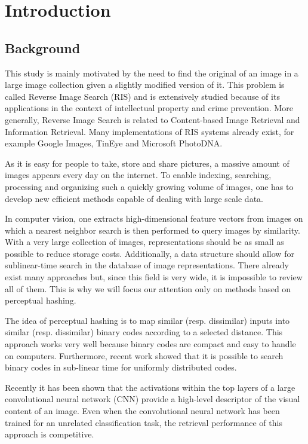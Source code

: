 \chapter{Introduction}

\section{Background}
This study is mainly motivated by the need to find the original of an image in a large image collection given a slightly modified version of it. This problem is called Reverse Image Search (RIS) and is extensively studied because of its applications in the context of intellectual property and crime prevention. More generally, Reverse Image Search is related to Content-based Image Retrieval and Information Retrieval. Many implementations of RIS systems already exist, for example Google Images, TinEye and Microsoft PhotoDNA.

As it is easy for people to take, store and share pictures, a massive amount of images appears every day on the internet. To enable indexing, searching, processing and organizing such a quickly growing volume of images, one has to develop new efficient methods capable of dealing with large scale data.

In computer vision, one extracts high-dimensional feature vectors from images on which a nearest neighbor search is then performed to query images by similarity. With a very large collection of images, representations should be as small as possible to reduce storage costs. Additionally, a data structure should allow for sublinear-time search in the database of image representations. There already exist many approaches but, since this field is very wide, it is impossible to review all of them. This is why we will focus our attention only on methods based on perceptual hashing.

The idea of perceptual hashing is to map similar (resp. dissimilar) inputs into similar (resp. dissimilar) binary codes according to a selected distance. This approach works very well because binary codes are compact and easy to handle on computers. Furthermore, recent work showed that it is possible to search binary codes in sub-linear time for uniformly distributed codes.

Recently it has been shown that the activations within the top layers of a large convolutional neural network (CNN) provide a high-level descriptor of the visual content of an image. Even when the convolutional neural network has been trained for an unrelated classification task, the retrieval performance of this approach is competitive.

